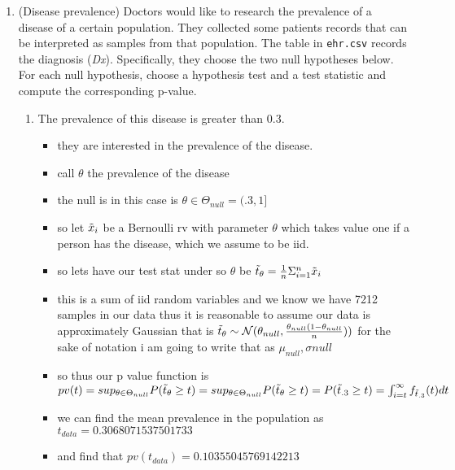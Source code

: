 \documentclass[12pt,twoside]{article}
\begin{document}
\begin{enumerate}
\item (Disease prevalence)
Doctors would like to research the prevalence of a disease of a certain population. They collected some patients records that can be interpreted as samples from that population. The table in \texttt{ehr.csv} records the diagnosis (\textit{Dx}). Specifically, they choose the two null hypotheses below. For each null hypothesis, choose a hypothesis test and a test statistic and compute the corresponding p-value. 
\begin{enumerate}
\item The prevalence of this disease is greater than 0.3.
\begin{itemize}
    \color{blue}
    \item they are interested in the prevalence of the disease.
    \item call $\theta$ the prevalence of the disease 
    \item the null is in this case is $\theta\in \Theta_{null}=(.3,1]$
    \item so let $\Tilde{x}_i$ be a Bernoulli rv with parameter $\theta$ which takes value one if a person has the disease, which we assume to be iid. 
    \item so lets have our test stat under so $\theta$ be $\Tilde{t}_{\theta}=\frac{1}{n}\Sigma_{i=1}^{n}\Tilde{x}_i$
    \item this is a sum of iid random variables and we know we have 7212 samples in our data thus it is reasonable to assume our data is approximately Gaussian that is $\Tilde{t}_{\theta}\sim \mathcal{N}(\theta_{null}, \frac{\theta_{null}(1-\theta_{null}}{n}))$ for the sake of notation i am going to write that as $\mu_{null}, \sigma{null}$
    \item so thus our p value function is $pv(t)=sup_{\theta\in \Theta_{null}}P(\Tilde{t}_{\theta}\geq t)=sup_{\theta\in \Theta_{null}}P(\Tilde{t}_{\theta}\geq t)=P(\Tilde{t}_{.3}\geq t)=\int_{i=t}^{\infty}f_{\Tilde{t}_{.3}}(t)dt$ 
    \item we can find the mean prevalence in the population as $t_{data}=0.3068071537501733$
    \item and find that $pv(t_{data})=0.10355045769142213$
\end{itemize}



\end{enumerate}
\end{enumerate}
\end{document}
